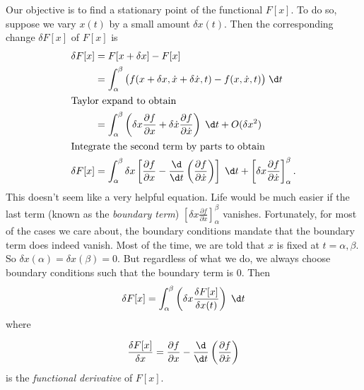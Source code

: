 \documentclass[a4paper]{article}
\begin{document}
Our objective is to find a stationary point of the functional $F[x]$. To do so, suppose we vary $x(t)$ by a small amount $\delta x(t)$. Then the corresponding change $\delta F[x]$ of $F[x]$ is
\begin{align*}
  \delta F[x] &= F[x + \delta x] - F[x]\\
  &= \int_\alpha ^\beta \big(f(x + \delta x, \dot{x} + \delta \dot{x}, t) - f(x, \dot{x}, t)\big)\;\d t\\
  \intertext{Taylor expand to obtain}
  &= \int_\alpha^\beta \left(\delta x\frac{\partial f}{\partial x} + \delta \dot{x} \frac{\partial f}{\partial \dot{x}}\right)\;\d t + O(\delta x^2)\\
  \intertext{Integrate the second term by parts to obtain}
  \delta F[x] &= \int_\alpha^\beta\delta x\left[\frac{\partial f}{\partial x} - \frac{\d}{\d t}\left(\frac{\partial f}{\partial \dot{x}}\right)\right]\;\d t + \left[ \delta x\frac{\partial f}{\partial \dot{x}}\right]_\alpha^\beta.
\end{align*}
This doesn't seem like a very helpful equation. Life would be much easier if the last term (known as the \emph{boundary term}) $\left[ \delta x\frac{\partial f}{\partial \dot{x}}\right]_\alpha^\beta$ vanishes. Fortunately, for most of the cases we care about, the boundary conditions mandate that the boundary term does indeed vanish. Most of the time, we are told that $x$ is fixed at $t = \alpha, \beta$. So $\delta x(\alpha) = \delta x(\beta) = 0$. But regardless of what we do, we always choose boundary conditions such that the boundary term is 0. Then
\[
  \delta F[x] = \int_\alpha ^\beta \left(\delta x \frac{\delta F[x]}{\delta x(t)}\right)\;\d t
\]
where
\begin{defi}
  \[
    \frac{\delta F[x]}{\delta x} = \frac{\partial f}{\partial x} - \frac{\d }{\d t}\left(\frac{\partial f}{\partial \dot{x}}\right)
  \]
  is the \emph{functional derivative} of $F[x]$.
\end{defi}
\end{document}
